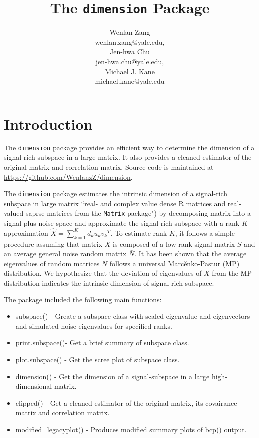 \documentclass[12pt]{article}
\title{The {\tt dimension} Package}
\author{Wenlan Zang \\
wenlan.zang@yale.edu,
\\[6pt]
Jen-hwa Chu \\
jen-hwa.chu@yale.edu,
\\[6pt]
Michael J. Kane \\
michael.kane@yale.edu
}
\begin{document}


\maketitle

\thispagestyle{empty}

\section{Introduction}

The {\tt dimension} package provides an efficient way to determine the dimension of a signal rich subspace in a large matrix. It also provides a cleaned estimator of the original matrix and correlation matrix. Source code is maintained at \href{https://github.com/WenlanzZ/dimension}{https://github.com/WenlanzZ/dimension}.

The {\tt dimension} package estimates the intrinsic dimension of a signal-rich subspace in large matrix ``real- and complex value dense R matrices and real-valued saprse matrices from the {\tt Matrix} package") by decomposing matrix into a signal-plus-noise space and approximate the signal-rich subspace with a rank $K$ approximation $\hat{X}=\sum_{k=1}^{K}d_ku_k{v_k}^T$. To estimate rank $K$, it follows a simple procedure assuming that matrix $X$ is composed of a low-rank signal matrix $S$ and an average general noise random matrix $\bar{N}$. It has been shown that the average eigenvalues of random matrices $N$ follows a universal Marc\u{e}nko-Pastur (MP) distribution. We hypothesize that the deviation of eigenvalues of $X$ from the MP distribution indicates the intrinsic dimension of signal-rich subspace.

The package included the following main functions:
\begin{itemize}
\item{subspace() - Greate a subspace class with scaled eigenvalue and eigenvectors and simulated noise eigenvalues for specified ranks.}
\item{print.subspace()- Get a brief summary of subspace class.}
\item{plot.subspace() - Get the scree plot of subspace class.}
\item{dimension() - Get the dimension of a signal-subspace in a large high-dimensional matrix.}
\item{clipped() - Get a cleaned estimator of the original matrix, its covairance matrix and correlation matrix.}
\item{modified\_legacyplot() - Produces modified summary plots of bcp() output.}
\end{itemize}
\end{document}
